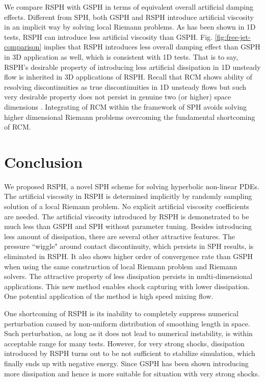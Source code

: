 We compare RSPH with GSPH in terms of equivalent overall artificial damping effects. Different from SPH, both GSPH and RSPH introduce artificial viscosity in an implicit way by solving local Riemann problems. As has been shown in 1D tests, RSPH can introduce less artificial viscosity than GSPH. Fig. \ref{fig:free-jet-comparison} implies that RSPH introduces less overall damping effect than GSPH in 3D application as well, which is consistent with 1D tests. That is to say, RSPH's desirable property of introducing less artificial dissipation in 1D unsteady flow is inherited in 3D applications of RSPH. Recall that RCM shows ability of resolving discontinuities as true discontinuities in 1D unsteady flows but such very desirable property does not persist in genuine two (or higher) space dimensions \citep{colella1982glimm}. Integrating of RCM within the framework of SPH avoids solving higher dimensional Riemann problems overcoming the fundamental shortcoming of RCM.

\section{Conclusion}
We proposed RSPH, a novel SPH scheme for solving hyperbolic non-linear PDEs. The artificial viscosity in RSPH is determined implicitly by randomly sampling solution of a local Riemann problem. No explicit artificial viscosity coefficients are needed. The artificial viscosity introduced by RSPH is demonstrated to be much less than GSPH and SPH without parameter tuning. Besides introducing less amount of dissipation, there are several other attractive features. The pressure ``wiggle" around contact discontinuity, which persists in SPH results, is eliminated in RSPH. It also shows higher order of convergence rate than GSPH when using the same construction of local Riemann problem and Riemann solvers. The attractive property of less dissipation persists in multi-dimensional applications.
This new method enables shock capturing with lower dissipation. One potential application of the method is high speed mixing flow.

One shortcoming of RSPH is its inability to completely suppress numerical perturbation caused by non-uniform distribution of smoothing length in space. Such perturbation, as long as it does not lead to numerical instability, is within acceptable range for many tests. However, for very strong shocks, dissipation introduced by RSPH turns out to be not sufficient to stabilize simulation, which finally ends up with negative energy. Since GSPH has been shown introducing more dissipation and hence is more suitable for situation with very strong shocks.

